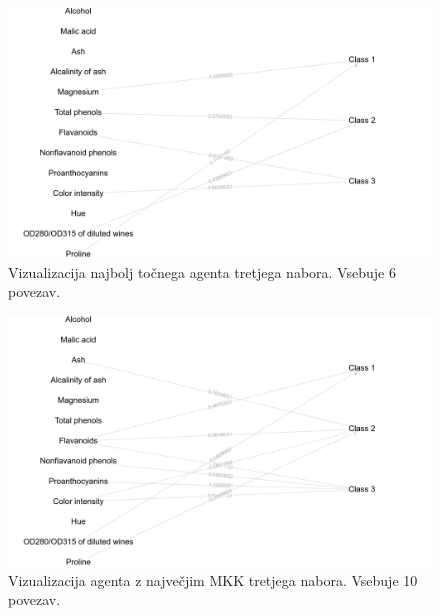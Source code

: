 \begin{figure}[H]
    \begin{center}
        \includegraphics[width=13cm]{wine/3/acc_g}
    \end{center}
    \caption{Vizualizacija najbolj točnega agenta tretjega nabora. Vsebuje 6 povezav.}
    \label{fig:wine_acc_3_g}
\end{figure}

\begin{figure}[H]
    \begin{center}
        \includegraphics[width=13cm]{wine/3/mcc_g}
    \end{center}
    \caption{Vizualizacija agenta z največjim MKK tretjega nabora. Vsebuje 10 povezav.}
    \label{fig:wine_mcc_3_g}
\end{figure}
